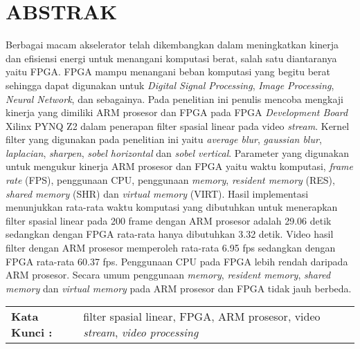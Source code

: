 \chapter*{ABSTRAK}

Berbagai macam akselerator telah dikembangkan dalam meningkatkan kinerja dan efisiensi energi untuk menangani komputasi berat, salah satu diantaranya yaitu FPGA. FPGA mampu menangani beban komputasi yang begitu berat sehingga dapat digunakan untuk \textit{Digital Signal Processing}, \textit{Image Processing}, \textit{Neural Network}, dan sebagainya.
Pada penelitian ini penulis mencoba mengkaji kinerja yang dimiliki ARM prosesor dan FPGA pada FPGA \textit{Development Board} Xilinx PYNQ Z2 dalam penerapan filter spasial linear pada video \textit{stream}. Kernel filter yang digunakan pada penelitian ini yaitu \textit{average blur}, \textit{gaussian blur}, \textit{laplacian}, \textit{sharpen}, \textit{sobel horizontal} dan \textit{sobel vertical}. Parameter yang digunakan untuk mengukur kinerja ARM prosesor dan FPGA yaitu waktu komputasi, \textit{frame rate} (FPS), penggunaan CPU, penggunaan \textit{memory}, \textit{resident memory} (RES), \textit{shared memory} (SHR) dan \textit{virtual memory} (VIRT).
Hasil implementasi menunjukkan rata-rata waktu komputasi yang dibutuhkan untuk menerapkan filter spasial linear pada 200 frame dengan ARM prosesor adalah 29.06 detik sedangkan dengan FPGA rata-rata hanya dibutuhkan 3.32 detik. Video hasil filter dengan ARM prosesor memperoleh rata-rata 6.95 fps sedangkan dengan FPGA rata-rata 60.37 fps. Penggunaan CPU pada FPGA lebih rendah daripada ARM prosesor. Secara umum penggunaan \textit{memory}, \textit{resident memory}, \textit{shared memory} dan \textit{virtual memory} pada ARM prosesor dan FPGA tidak jauh berbeda.


\begin{table}[h]
    \begin{tabular}{ p{} p{} }
        \\
        \textbf{Kata Kunci :} & filter spasial linear, FPGA, ARM prosesor, video \textit{stream}, \textit{video processing}
    \end{tabular}
\end{table}

 
